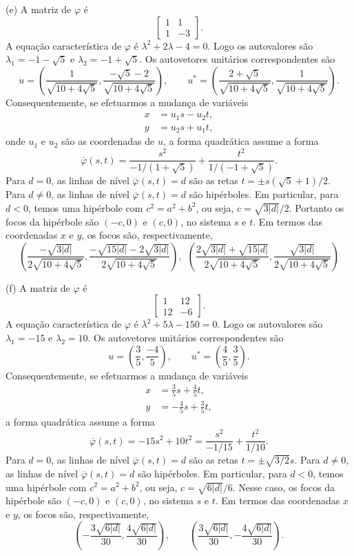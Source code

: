\documentclass[a4paper,11pt]{article}
\begin{document}
(e)
A matriz de $\varphi$ é
\[
  \begin{bmatrix}
    1 & 1 \\
    1 & -3
  \end{bmatrix}.
\]
A equação característica de $\varphi$ é $\lambda^2 + 2 \lambda - 4 = 0$.
Logo os autovalores são $\lambda_1 = -1-\sqrt{5}$ e $\lambda_2 = -1+\sqrt{5}$.
Os autovetores unitários correspondentes são
\[
  u = \left( \frac{1}{\sqrt{10 + 4\sqrt{5}}}, \frac{-\sqrt{5}-2}{\sqrt{10 + 4\sqrt{5}}} \right), \qquad u^* = \left( \frac{2+\sqrt{5}}{\sqrt{10 + 4\sqrt{5}}}, \frac{1}{\sqrt{10 + 4\sqrt{5}}} \right).
\]
Consequentemente, se efetuarmos a mudança de variáveis
\begin{align*}
  x & = u_1 s - u_2 t, \\
  y & = u_2 s + u_1 t,
\end{align*}
onde $u_1$ e $u_2$ são as coordenadas de $u$, a forma quadrática assume a forma
\[
  \overline{\varphi}(s,t) = \frac{s^2}{-1/(1+\sqrt{5})} + \frac{t^2}{1/(-1+\sqrt{5})}.
\]
Para $d = 0$, as linhas de nível $\overline{\varphi}(s,t) = d$ são as retas $t = \pm s (\sqrt{5} + 1)/2$.
Para $d \neq 0$, as linhas de nível $\overline{\varphi}(s,t) = d$ são hipérboles.
Em particular, para $d < 0$, temos uma hipérbole com $c^2 = a^2 + b^2$, ou seja, $c = \sqrt{3|d|}/2$.
Portanto os focos da hipérbole são $(-c,0)$ e $(c,0)$, no sistema $s$ e $t$.
Em termos das coordenadas $x$ e $y$, os focos são, respectivamente,
\[
  \left( \frac{-\sqrt{3|d|}}{2\sqrt{10 + 4\sqrt{5}}}, \frac{-\sqrt{15|d|}-2\sqrt{3|d|}}{2\sqrt{10 + 4\sqrt{5}}} \right), \ \ \left( \frac{2\sqrt{3|d|}+\sqrt{15|d|}}{2\sqrt{10 + 4\sqrt{5}}}, \frac{\sqrt{3|d|}}{2\sqrt{10 + 4\sqrt{5}}} \right)
\]

(f)
A matriz de $\varphi$ é
\[
  \begin{bmatrix}
    1 & 12 \\
    12 & -6
  \end{bmatrix}.
\]
A equação característica de $\varphi$ é $\lambda^2 + 5\lambda - 150 = 0$.
Logo os autovalores são $\lambda_1 = -15$ e $\lambda_2 = 10$.
Os autovetores unitários correspondentes são
\[
  u = \left( \frac{3}{5}, \frac{-4}{5} \right), \qquad u^* = \left( \frac{4}{5}, \frac{3}{5} \right).
\]
Consequentemente, se efetuarmos a mudança de variáveis
\begin{align*}
  x & = \frac{3}{5} s + \frac{4}{5} t, \\
  y & = -\frac{4}{5} s + \frac{3}{5} t,
\end{align*}
a forma quadrática assume a forma
\[
  \overline{\varphi}(s,t) = -15 s^2 + 10 t^2 = \frac{s^2}{-1/15} + \frac{t^2}{1/10}.
\]
Para $d = 0$, as linhas de nível $\overline{\varphi}(s,t) = d$ são as retas $t = \pm \sqrt{3/2} s$.
Para $d \neq 0$, as linhas de nível $\overline{\varphi}(s,t) = d$ são hipérboles.
Em particular, para $d < 0$, temos uma hipérbole com $c^2 = a^2 + b^2$, ou seja, $c = \sqrt{6|d|}/6$.
Nesse caso, os focos da hipérbole são $(-c,0)$ e $(c,0)$, no sistema $s$ e $t$.
Em termos das coordenadas $x$ e $y$, os focos são, respectivamente,
\[
  \left( -\frac{3\sqrt{6|d|}}{30}, \frac{4\sqrt{6|d|}}{30} \right), \qquad \left( \frac{3\sqrt{6|d|}}{30}, -\frac{4\sqrt{6
|d|}}{30} \right).
\]
\end{document}
